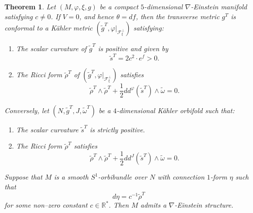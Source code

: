 \documentclass{article}
\newtheorem{thm}{Theorem}[section]
\theoremstyle{definition}
\renewcommand{\phi}{\varphi}
\numberwithin{equation}{section}
\begin{document}
\begin{thm} \label{thm:caracterization}
Let $(M,\phi,\xi,g)$ be a compact $5$-dimensional $\nabla$-Einstein manifold satisfying $c \neq 0$. If $V = 0$, and hence $\theta=df$, then the transverse metric $g^T$ is conformal to a K\"ahler metric $(\tilde g^T, \phi|_{\mathcal{F}^\perp_\xi})$ satisfying:
\begin{enumerate}
    \item The scalar curvature of $\tilde g^T$ is positive and given by
    \[
    \tilde{s}^T = 2 c^2 \cdot e^f > 0.
    \]
    \item The Ricci form $\tilde \rho^T$ of $(\tilde g^T, \phi|_{\mathcal{F}^\perp_\xi})$ satisfies
    \begin{equation} \label{eqn:4dim}
        \tilde \rho^T \wedge \tilde \rho^T + \frac{1}{2} dd^\phi (\tilde s^T) \wedge \tilde \omega = 0.
    \end{equation}
\end{enumerate}

Conversely, let $(N, \tilde g^T, J, \tilde \omega^T)$ be a $4$-dimensional K\"ahler orbifold such that:
\begin{enumerate}
    \item The scalar curvature $\tilde{s}^T$ is strictly positive.
    \item The Ricci form $\tilde \rho^T$ satisfies
    \begin{equation} \label{eqn:dim41}
        \tilde \rho^T \wedge \tilde \rho^T + \frac{1}{2} dd^J (\tilde s^T) \wedge \tilde \omega = 0.
    \end{equation}
\end{enumerate}
Suppose that $M$ is a smooth $S^1$-orbibundle over $N$ 
with connection $1$-form $\eta$ such that
\[
d\eta = c^{-1} \tilde \rho^T
\]
for some non--zero constant $c \in \mathbb{R}^*$. Then $M$ admits a $\nabla$-Einstein structure.
\end{thm}
\end{document}
